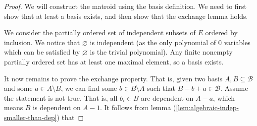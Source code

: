 \begin{proof}
    We will construct the matroid using the basis definition. We need to first show that at least a basis exists, and then show that the exchange lemma holds.

  We consider the partially ordered set of independent subsets of $E$ ordered by inclusion. We notice that $ \varnothing $ is independent (as the only polynomial of $0$ variables which can be satisfied by $\varnothing $ is the trivial polynomial). Any finite nonempty partially ordered set has at least one maximal element, so a basis exists.

  It now remains to prove the exchange property. That is, given two basis $A, B \subseteq \mathcal B$ and some $a \in A \setminus B$, we can find some $b \in B \setminus A$ such that $B - b + a \in \mathcal B$. Assume the statement is not true. That is, all $b _i \in B$ are dependent on $A - a$, which means $B$ is dependent on $A - 1$. It follows from lemma (\ref{lem:algebraic-indep-smaller-than-dep}) that 
\end{proof}
